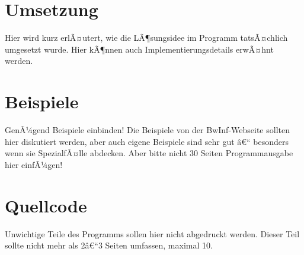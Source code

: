 \documentclass[a4paper,10pt,ngerman]{scrartcl}
\begin{document}
\section{Umsetzung}
Hier wird kurz erlÃ¤utert, wie die LÃ¶sungsidee im Programm tatsÃ¤chlich umgesetzt wurde. Hier kÃ¶nnen auch Implementierungsdetails erwÃ¤hnt werden.

\section{Beispiele}
GenÃ¼gend Beispiele einbinden! Die Beispiele von der BwInf-Webseite sollten hier diskutiert werden, aber auch eigene Beispiele sind sehr gut â€“ besonders wenn sie SpezialfÃ¤lle abdecken. Aber bitte nicht 30 Seiten Programmausgabe hier einfÃ¼gen!

\section{Quellcode}
Unwichtige Teile des Programms sollen hier nicht abgedruckt werden. Dieser Teil sollte nicht mehr als 2â€“3 Seiten umfassen, maximal 10.
\end{document}
